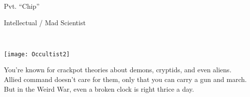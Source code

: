 \documentclass{article}
\newcommand{\Bra}{2}
\newcommand{\Agi}{3}
\newcommand{\Int}{3}
\newcommand{\Cun}{2}
\newcommand{\Wil}{3}
\newcommand{\Pre}{2}
\begin{document}
\begin{minipage}{0.6\linewidth}
{\Huge Pvt. ``Chip'' }

{\large Intellectual / Mad Scientist}

\vspace{1.5em}

\end{minipage}\hfill%
\\

\vspace{0em}\raggedright
\begin{multicols}{2}
\texttt{[image: Occultist2]}

\columnbreak

You're known for crackpot theories about demons, cryptids, and even aliens.  Allied command doesn't care for them, only that you can carry a gun and march.  But in the Weird War, even a broken clock is right thrice a day.
\end{multicols}


\begin{center}
\Characteristics{\Bra}{\Agi}{\Int}{\Cun}{\Wil}{\Pre}

\noindent\null\hfill{}\quad
{}\null\quad
{}\quad
{}\hfill\null
{}\quad
\end{center}


\vspace{0.5em}



\vspace{-3em}
\end{document}
